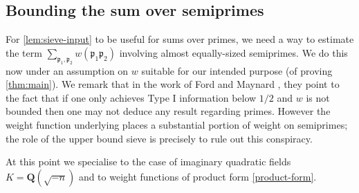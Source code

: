 \documentclass[11pt,reqno]{amsart}
\numberwithin{equation}{section}
\theoremstyle{definition}
\theoremstyle{remark}
\newcommand{\mf}{\mathfrak}
\newcommand\Q{\mathbf{Q}}
\begin{document}
\subsection{Bounding the sum over semiprimes}
For \cref{lem:sieve-input} to be useful for sums over primes, we need a way to estimate the term $\sum_{\mf{p}_1, \mf{p}_2} w(\mf{p}_1\mf{p}_2)$ involving almost equally-sized semiprimes. We do this now under an assumption on $w$ suitable for our intended purpose (of proving \cref{thm:main}). We remark that in the work of Ford and Maynard \cite[Theorem~4.16]{FM24}, they point to the fact that if one only achieves Type I information below $1/2$ and $w$ is not bounded then one may not deduce any result regarding primes. However the weight function underlying \cite[Theorem~4.16]{FM24} places a substantial portion of weight on semiprimes; the role of the upper bound sieve is precisely to rule out this conspiracy. 


At this point we specialise to the case of imaginary quadratic fields $K = \Q(\sqrt{-n})$ and to weight functions of product form \cref{product-form}. 
\end{document}
